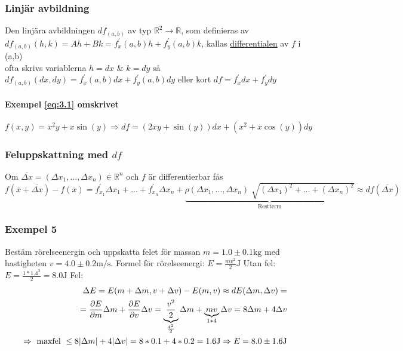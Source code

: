 \documentclass{article}
\DeclarePairedDelimiter \abs{\lvert}{\rvert}
\let\oldsqrt\sqrt
\renewcommand*{\sqrt}[2][\ ]{\oldsqrt[#1]{#2} }
\begin{document}
\newpage

\subsubsection{Linjär avbildning}

Den linjära avbildningen \(df_{(a,b)}\) av typ \(\mathbb{R}^2 \rightarrow \mathbb{R}\), som definieras av \(df_{(a,b)}(h,k) = Ah + Bk = 
f_{x}^{\prime}(a,b)h + f_{y}^{\prime}(a,b)k\), kallas \underline{differentialen} av \(f\) i (a,b) \\
ofta skrivs variablerna \(h=dx\) \& \(k=dy\) så \(df_{(a,b)}(dx,dy) = f_{x}^{\prime}(a,b)dx + f_{y}^{\prime}(a,b)dy\) eller kort \(df = f_{x}^{\prime}dx + f_{y}^{\prime}dy\)

\paragraph{Exempel \eqref{eq:3.1} omskrivet}

\[
	f(x,y) = x^2y + x\sin(y) \Rightarrow df = (2xy+\sin(y))dx + (x^2+x\cos(y))dy
\]

\subsubsection*{Feluppskattning med \(df\)}

Om \(\overline{\Delta x} = (\Delta x_{1},...,\Delta x_{n}) \in \mathbb{R}^n\) och \(f\) är differentierbar fås 
\(f(\overline{x} + \overline{\Delta x}) - f(\overline{x}) = 
f_{x_{1}}^{\prime}\Delta x_{1} + ... + f_{x_{n}}^{\prime}\Delta x_{n} + \underbrace{\rho(\Delta x_{1},...,\Delta x_{n})\sqrt{(\Delta x_{1})^2 + ... + (\Delta x_{n})^2}}_{\text{Restterm}} \approx df(\overline{\Delta x})\) 

\subsubsection{Exempel 5}

Bestäm rörelseenergin och uppskatta felet för massan \(m = 1.0 \pm 0.1\si{\kilogram}\) med hastigheten \(v = 4.0 \pm 0.2\si{\metre\per\second}\). \newline
Formel för rörelseenergi: \(E = \frac{mv^2}{2} \si{\joule}\) \newline
Utan fel: \(E = \frac{1*1.4^2}{2} = 8.0 \si{\joule}\) \newline
Fel: 
\[
\begin{split}
	\Delta E = E(m + \Delta m, v + \Delta v) - E(m,v) \approx dE(\Delta m,\Delta v) = \\
	= \frac{\partial E}{\partial m} \Delta m + \frac{\partial E}{\partial v} \Delta v = \underbrace{\frac{v^2}{2}}_{\frac{4^2}{2}} \Delta m + \underbrace{mv}_{1*4} \Delta v = 8\Delta m + 4\Delta v \\
	\Rightarrow \text{ maxfel } \leq 8\abs{\Delta m} + 4\abs{\Delta v} = 8*0.1 + 4*0.2 = 1.6 \si{\joule} \Rightarrow E = 8.0 \pm 1.6 \si{\joule}
\end{split}
\]
\end{document}
